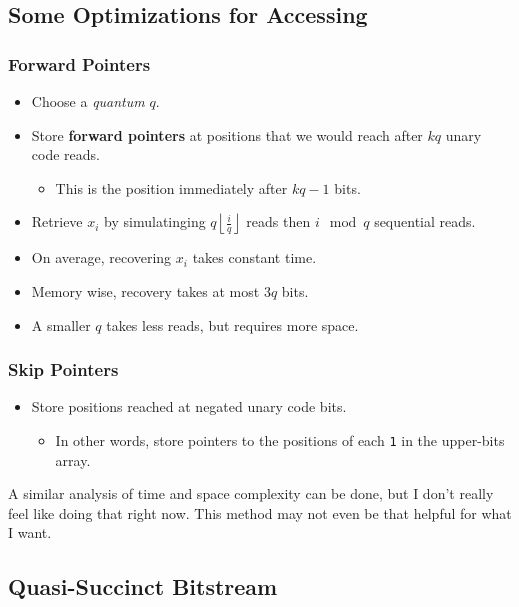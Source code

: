 \documentclass[10pt]{article}
\begin{document}
\subsection{Some Optimizations for Accessing}\label{optimizations}

\subsubsection{Forward Pointers}\label{forward-pointers}
\begin{itemize}
\item
    Choose a \textit{quantum} \(q\).
\item
    Store \textbf{forward pointers} at positions that we would reach after 
    \(kq\) unary code reads.
    \begin{itemize}
    \item
        This is the position immediately after \(kq - 1\) bits.
    \end{itemize}
\item
    Retrieve \(x_i\) by simulatinging \(q \left \lfloor \frac{i}{q} \right \rfloor\) reads
    then \(i \mod q\) sequential reads.
\item
    On average, recovering \(x_i\) takes constant time.
\item
    Memory wise, recovery takes at most \(3q\) bits.
\item
    A smaller \(q\) takes less reads, but requires more space.
\end{itemize}
\subsubsection{Skip Pointers}\label{skip-pointers}
\begin{itemize}
\item
    Store positions reached at negated unary code bits.
    \begin{itemize}
    \item
        In other words, store pointers to the positions of each \texttt{1} in the
        upper-bits array.
    \end{itemize}
\end{itemize}
A similar analysis of time and space complexity can be done, but I don't really feel
like doing that right now. This method may not even be that helpful for what I want.

\subsection{Quasi-Succinct Bitstream}\label{quasi-succinct-bitstream}
\end{document}
